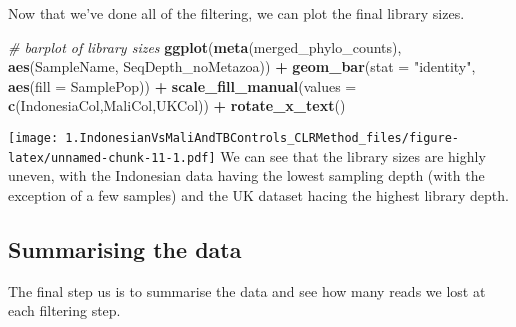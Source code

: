 \documentclass[]{article}
\newenvironment{Shaded}{\begin{snugshade}}{\end{snugshade}}
\newcommand{\CommentTok}[1]{\textcolor[rgb]{0.56,0.35,0.01}{\textit{#1}}}
\newcommand{\DataTypeTok}[1]{\textcolor[rgb]{0.13,0.29,0.53}{#1}}
\newcommand{\KeywordTok}[1]{\textcolor[rgb]{0.13,0.29,0.53}{\textbf{#1}}}
\newcommand{\NormalTok}[1]{#1}
\newcommand{\OperatorTok}[1]{\textcolor[rgb]{0.81,0.36,0.00}{\textbf{#1}}}
\newcommand{\StringTok}[1]{\textcolor[rgb]{0.31,0.60,0.02}{#1}}
\begin{document}
Now that we've done all of the filtering, we can plot the final library
sizes.

\begin{Shaded}
\begin{Highlighting}[]
\CommentTok{# barplot of library sizes}
\KeywordTok{ggplot}\NormalTok{(}\KeywordTok{meta}\NormalTok{(merged_phylo_counts), }\KeywordTok{aes}\NormalTok{(SampleName, SeqDepth_noMetazoa)) }\OperatorTok{+}\StringTok{ }\KeywordTok{geom_bar}\NormalTok{(}\DataTypeTok{stat =} \StringTok{"identity"}\NormalTok{, }\KeywordTok{aes}\NormalTok{(}\DataTypeTok{fill =}\NormalTok{ SamplePop)) }\OperatorTok{+}
\KeywordTok{scale_fill_manual}\NormalTok{(}\DataTypeTok{values =} \KeywordTok{c}\NormalTok{(IndonesiaCol,MaliCol,UKCol)) }\OperatorTok{+}\StringTok{ }\KeywordTok{rotate_x_text}\NormalTok{()}
\end{Highlighting}
\end{Shaded}

\texttt{[image: 1.IndonesianVsMaliAndTBControls\_CLRMethod\_files/figure-latex/unnamed-chunk-11-1.pdf]}
We can see that the library sizes are highly uneven, with the Indonesian
data having the lowest sampling depth (with the exception of a few
samples) and the UK dataset hacing the highest library depth.

\hypertarget{summarising-the-data}{%
\subsection{Summarising the data}\label{summarising-the-data}}

The final step us is to summarise the data and see how many reads we
lost at each filtering step.
\end{document}
